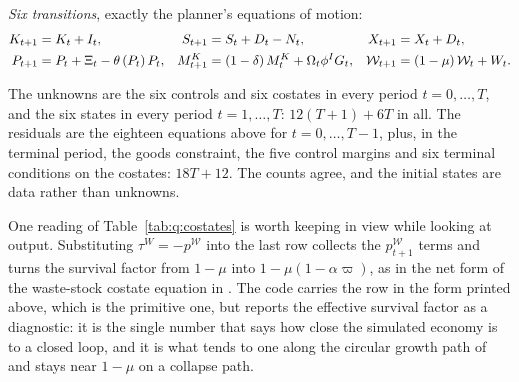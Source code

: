\emph{Six transitions}, exactly the planner's equations of motion:
\begin{align}
K_{t+1} &= K_t+I_t,
&
S_{t+1} &= S_t+D_t-N_t,
&
X_{t+1} &= X_t+D_t,
\notag\\
P_{t+1} &= P_t+\Xi_t-\theta\left(P_t\right)P_t,
&
M^K_{t+1} &= \left(1-\delta\right)M^K_t+\Omega_t\phi^IG_t,
&
\mathcal W_{t+1} &= \left(1-\mu\right)\mathcal W_t+W_t .
\label{eq:q:transitions}
\end{align}

 The unknowns are the six controls and six costates in every period $t=0,\dots,T$, and the six states in every period $t=1,\dots,T$: $12\left(T+1\right)+6T$ in all. The residuals are the eighteen equations above for $t=0,\dots,T-1$, plus, in the terminal period, the goods constraint, the five control margins and six terminal conditions on the costates: $18T+12$. The counts agree, and the initial states are data rather than unknowns.

 One reading of Table~\ref{tab:q:costates} is worth keeping in view while looking at output. Substituting $\tau^W=-p^{\mathcal W}$ into the last row collects the $p^{\mathcal W}_{t+1}$ terms and turns the survival factor from $1-\mu$ into $1-\mu\left(1-\alpha\varpi\right)$, as in the net form of the waste-stock costate equation in . The code carries the row in the form printed above, which is the primitive one, but reports the effective survival factor as a diagnostic: it is the single number that says how close the simulated economy is to a closed loop, and it is what tends to one along the circular growth path of  and stays near $1-\mu$ on a collapse path.
